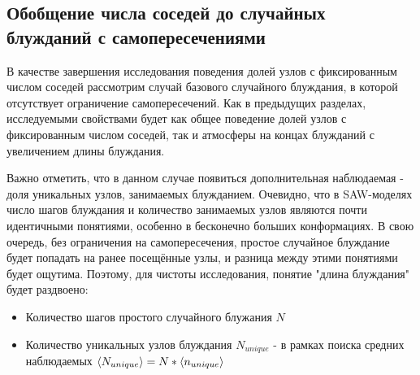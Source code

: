 \subsection{Обобщение числа соседей до случайных блужданий с самопересечениями}

В качестве завершения исследования поведения долей узлов с фиксированным числом соседей рассмотрим случай базового случайного блуждания, в которой отсутствует ограничение самопересечений. Как в предыдущих разделах, исследуемыми свойствами будет как общее поведение долей узлов с фиксированным числом соседей, так и атмосферы на концах блужданий с увеличением длины блуждания. 

Важно отметить, что в данном случае появиться дополнительная наблюдаемая - доля уникальных узлов, занимаемых блужданием. Очевидно, что в SAW-моделях число шагов блуждания и количество занимаемых узлов являются почти идентичными понятиями, особенно в бесконечно больших конформациях. В свою очередь, без ограничения на самопересечения, простое случайное блуждание будет попадать на ранее посещённые узлы, и разница между этими понятиями будет ощутима. Поэтому, для чистоты исследования, понятие "длина блуждания" будет раздвоено:

\begin{itemize}
\item Количество шагов простого случайного блужания $N$
\item Количество уникальных узлов блуждания $N_{unique}$ - в рамках поиска средних наблюдаемых $\langle N_{unique} \rangle = N * \langle n_{unique} \rangle$ 
\end{itemize}


